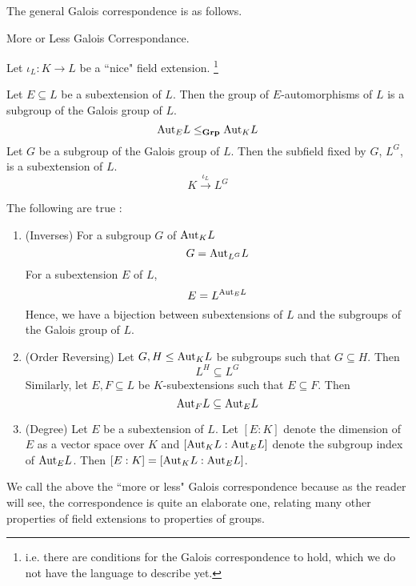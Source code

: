 \documentclass[../book.tex]{subfiles}
\begin{document}
The general Galois correspondence is as follows. 
\begin{thm} More or Less Galois Correspondance. 
    
    Let $\iota_L : K \to L$ be a ``nice" field extension.
    \footnote{
        i.e. there are conditions for the Galois correspondence to hold,
        which we do not have the language to describe yet.
    }
    
    Let $E \subseteq L$ be a subextension of $L$. 
    Then the group of $E$-automorphisms of $L$ is
    a subgroup of the Galois group of $L$. \[
        \mathrm{Aut}_{E}L \leq_{\mathbf{Grp}} \mathrm{Aut}_{K}L
    \]
    Let $G$ be a subgroup of the Galois group of $L$. 
    Then the subfield fixed by $G$, $L^G$, is a subextension of $L$.
    \[ K \overset{\iota_L}{\to} L^G \]
    
    The following are true :  
    \begin{enumerate}
        \item (Inverses)
            For a subgroup $G$ of $\mathrm{Aut}_{K}L$ \[
                G = \mathrm{Aut}_{L^G}L
            \]
            For a subextension $E$ of $L$, \[
                E = L^{\mathrm{Aut}_{E}L}
            \]
            Hence, we have a bijection between subextensions of $L$
            and the subgroups of the Galois group of $L$.
            
            \begin{figure} [H]
                \centering
            \end{figure}
            
            \item (Order Reversing) 
            Let $G, H \leq \mathrm{Aut}_{K}L$ be subgroups such that $G \subseteq H$.
            Then \[ L^H \subseteq L^G \]
            Similarly, 
            let $E, F \subseteq L$ be $K$-subextensions such that $E \subseteq F$.
            Then \[ \mathrm{Aut}_{F}L \subseteq \mathrm{Aut}_{E}L \]
        \item (Degree) 
            Let $E$ be a subextension of $L$. 
            Let $[E : K]$ denote the dimension of $E$ as a vector space over $K$
            and $[\mathrm{Aut}_{K}L : \mathrm{Aut}_{E}L]$ denote the subgroup index of $\mathrm{Aut}_{E}L$.
            Then $[E : K] = [\mathrm{Aut}_{K}L : \mathrm{Aut}_{E}L]$. 
    \end{enumerate}
\end{thm}
We call the above the ``more or less" Galois correspondence because
as the reader will see, the correspondence is quite an elaborate one,
relating many other properties of field extensions to properties of groups. 
\end{document}
